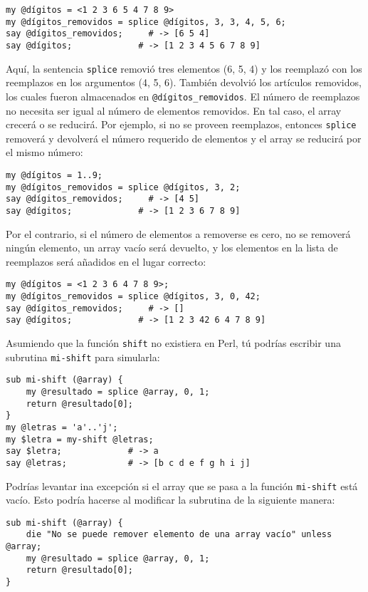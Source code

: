 \begin{lstlisting}
my @dígitos = <1 2 3 6 5 4 7 8 9>
my @dígitos_removidos = splice @dígitos, 3, 3, 4, 5, 6;
say @dígitos_removidos;     # -> [6 5 4]
say @dígitos;             # -> [1 2 3 4 5 6 7 8 9]
\end{lstlisting}
%
Aquí, la sentencia {\tt splice} removió tres elementos (6, 5, 4)
y los reemplazó con los reemplazos en los argumentos (4, 5, 6).
También devolvió los artículos removidos, los cuales
fueron almacenados en \verb|@dígitos_removidos|.
El número de reemplazos no necesita ser igual al número de elementos
removidos. En tal caso, el array crecerá o se reducirá. Por ejemplo,
si no se proveen reemplazos, entonces {\tt splice} removerá y devolverá
el número requerido de elementos y el array se reducirá por el
mismo número:

\begin{lstlisting}
my @dígitos = 1..9;
my @dígitos_removidos = splice @dígitos, 3, 2;
say @dígitos_removidos;     # -> [4 5]
say @dígitos;             # -> [1 2 3 6 7 8 9]
\end{lstlisting}
%

Por el contrario, si el número de elementos a removerse es
cero, no se removerá ningún elemento, un array vacío será
devuelto, y los elementos en la lista de reemplazos será
añadidos en el lugar correcto:

\begin{lstlisting}
my @dígitos = <1 2 3 6 4 7 8 9>;
my @dígitos_removidos = splice @dígitos, 3, 0, 42;
say @dígitos_removidos;     # -> []
say @dígitos;             # -> [1 2 3 42 6 4 7 8 9]
\end{lstlisting}
%

Asumiendo que la función {\tt shift} no existiera en Perl,
tú podrías escribir una subrutina {\tt mi-shift} para 
simularla:

\begin{lstlisting}
sub mi-shift (@array) {
    my @resultado = splice @array, 0, 1;
    return @resultado[0];
}
my @letras = 'a'..'j';
my $letra = my-shift @letras;
say $letra;             # -> a
say @letras;            # -> [b c d e f g h i j]
\end{lstlisting}

Podrías levantar ina excepción si el array que se
pasa a la función {\tt mi-shift} está vacío. Esto
podría hacerse al modificar la subrutina de la siguiente
manera:

\begin{lstlisting}
sub mi-shift (@array) {
    die "No se puede remover elemento de una array vacío" unless @array;
    my @resultado = splice @array, 0, 1;
    return @resultado[0];
}
\end{lstlisting}
%

